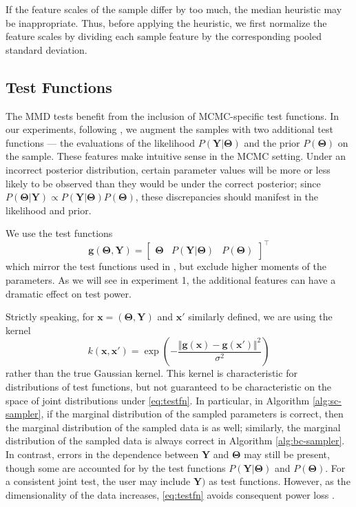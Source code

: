 \documentclass[a4paper,12pt]{article}
\begin{document}
If the feature scales of the sample differ by too much, the median heuristic may be inappropriate. Thus, before applying the heuristic, we first normalize the feature scales by dividing each sample feature by the corresponding pooled standard deviation.

\subsection{Test Functions}
\label{section:testfn}
The MMD tests benefit from the inclusion of MCMC-specific test functions. In our experiments, following \cite{gandy_unit_2020}, we augment the samples with two additional test functions --- the evaluations of the likelihood $P(\mathbf{Y}|\mathbf{\Theta})$ and the prior $P(\mathbf{\Theta})$ on the sample. These features make intuitive sense in the MCMC setting. Under an incorrect posterior distribution, certain parameter values will be more or less likely to be observed than they would be under the correct posterior; since $P(\mathbf{\Theta}|\mathbf{Y}) \propto P(\mathbf{Y}|\mathbf{\Theta}) P(\mathbf{\Theta})$, these discrepancies should manifest in the likelihood and prior.

We use the test functions
\begin{equation}
    \mathbf{g}(\mathbf{\Theta}, \mathbf{Y}) = \begin{bmatrix} \mathbf{\Theta} & P(\mathbf{Y}|\mathbf{\Theta}) & P(\mathbf{\Theta}) \end{bmatrix}^{\top}
    \label{eq:testfn}
\end{equation}
which mirror the test functions used in \cite{gandy_unit_2020}, but exclude higher moments of the parameters. As we will see in experiment 1, the additional features can have a dramatic effect on test power.

Strictly speaking, for $\mathbf{x} = (\mathbf{\Theta}, \mathbf{Y})$ and $\mathbf{x}'$ similarly defined, we are using the kernel
\begin{equation}
    k(\mathbf{x}, \mathbf{x'}) = \exp{\left( -\frac{\Vert \mathbf{g}(\mathbf{x})-\mathbf{g}(\mathbf{x}') \Vert^{2}}{\sigma^{2}} \right)}
\end{equation}
rather than the true Gaussian kernel. This kernel is characteristic for distributions of test functions, but not guaranteed to be characteristic on the space of joint distributions under \eqref{eq:testfn}. In particular, in Algorithm \ref{alg:sc-sampler}, if the marginal distribution of the sampled parameters is correct, then the marginal distribution of the sampled data is as well; similarly, the marginal distribution of the sampled data is always correct in Algorithm \ref{alg:bc-sampler}. In contrast, errors in the dependence between $\mathbf{Y}$ and $\mathbf{\Theta}$ may still be present, though some are accounted for by the test functions $P(\mathbf{Y}|\mathbf{\Theta})$ and $P(\mathbf{\Theta})$. For a consistent joint test, the user may include $\mathbf{Y})$ as test functions. However, as the dimensionality of the data increases, \eqref{eq:testfn} avoids consequent power loss \cite{reddi_decreasing_2014}.
\end{document}
